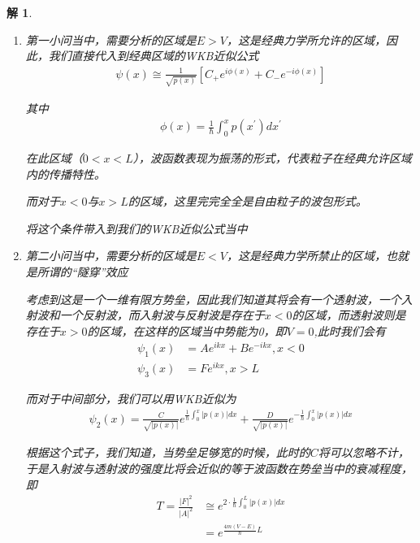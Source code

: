 \documentclass{article}
\newtheorem{solution}{解}
\begin{document}
\begin{solution}
    \begin{enumerate}
        \item 第一小问当中，需要分析的区域是$E>V$，这是经典力学所允许的区域，因此，我们直接代入到经典区域的WKB近似公式
        \begin{align*}
            \psi(x)\cong \frac{1}{\sqrt{p(x)}}\left[C_+e^{i\phi(x)}+C_-e^{-i\phi(x)}\right]
        \end{align*}

        其中
        \begin{align*}
            \phi(x)=\frac{1}{\hbar}\int_{0}^{x}p(x^\prime)dx^\prime
        \end{align*}

        在此区域（$0<x<L$），波函数表现为振荡的形式，代表粒子在经典允许区域内的传播特性。

        而对于$x<0$与$x>L$的区域，这里完完全全是自由粒子的波包形式。

        
        
        将这个条件带入到我们的WKB近似公式当中
        \item 第二小问当中，需要分析的区域是$E<V$，这是经典力学所禁止的区域，也就是所谓的“隧穿”效应
        
        考虑到这是一个一维有限方势垒，因此我们知道其将会有一个透射波，一个入射波和一个反射波，而入射波与反射波是存在于$x<0$的区域，而透射波则是存在于$x>0$的区域，在这样的区域当中势能为0，即$V=0$,此时我们会有
        \begin{align*}
            \psi_1(x)&=Ae^{ikx}+Be^{-ikx},x<0\\
            \psi_3(x)&=Fe^{ikx},x>L
        \end{align*}

        而对于中间部分，我们可以用WKB近似为
        \begin{align*}
            \psi_2(x)=\frac{C}{\sqrt{|p(x)|}}e^{\displaystyle\frac{1}{\hbar}\int_{0}^{x}|p(x)|dx}+\frac{D}{\sqrt{|p(x)|}}e^{\displaystyle-\frac{1}{\hbar}\int_{0}^{x}|p(x)|dx}
        \end{align*}

    根据这个式子，我们知道，当势垒足够宽的时候，此时的$C$将可以忽略不计，于是入射波与透射波的强度比将会近似的等于波函数在势垒当中的衰减程度，即
    \begin{align*}
        T=\frac{|F|^2}{|A|^2}&\cong  e^{\displaystyle 2\cdot\frac{1}{\hbar}\int_{0}^{L}|p(x)|dx}\\
        &= e^{\displaystyle\frac{4m(V-E)}{\hbar}L}
    \end{align*}
    \end{enumerate}


\end{solution}
\end{document}
